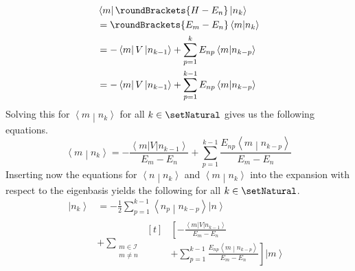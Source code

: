 \documentclass[10pt,fleqn]{article}
\newcommand{\bra}[1]{\left\langle #1 \right\vert}
\newcommand{\ket}[1]{\left\vert #1 \right\rangle}
\newcommand{\bracket}[2]{\left\langle #1 \middle\vert #2 \right\rangle}
\begin{document}
\begin{multicols}{2}
\begin{align*}
        &\bra{m}\roundBrackets{H-E_n}\ket{n_k} \\
        &= \roundBrackets{E_m-E_n}\bracket{m}{n_k} \\
        &= -\bra{m}V\ket{n_{k-1}} + \sum_{p=1}^k E_{np}\bracket{m}{n_{k-p}} \\
        &= -\bra{m}V\ket{n_{k-1}} + \sum_{p=1}^{k-1} E_{np}\bracket{m}{n_{k-p}}
      \end{align*}
      Solving this for $\bracket{m}{n_k}$ for all $k\in\setNatural$ gives us the following equations.
      \[
        \bracket{m}{n_k} = -\frac{\bra{m}V\ket{n_{k-1}}}{E_m-E_n} + \sum_{p=1}^{k-1} \frac{E_{np}\bracket{m}{n_{k-p}}}{E_m - E_n}
      \]
      Inserting now the equations for $\bracket{n}{n_k}$ and $\bracket{m}{n_k}$ into the expansion with respect to the eigenbasis yields the following for all $k\in\setNatural$.
      \begin{align*}
        \ket{n_k} &= -\frac{1}{2}\sum_{p=1}^{k-1} \bracket{n_p}{n_{k-p}}\ket{n} \\
        &+ \sum_{\substack{m\in\mathscr{I}\\m\neq n}}
          \begin{aligned}[t]
            &\left[ -\frac{\bra{m}V\ket{n_{k-1}}}{E_m-E_n} \right. \\
            &\left. + \sum_{p=1}^{k-1} \frac{E_{np}\bracket{m}{n_{k-p}}}{E_m - E_n} \right] \ket{m}
          \end{aligned}
      \end{align*}


\end{multicols}
\end{document}
